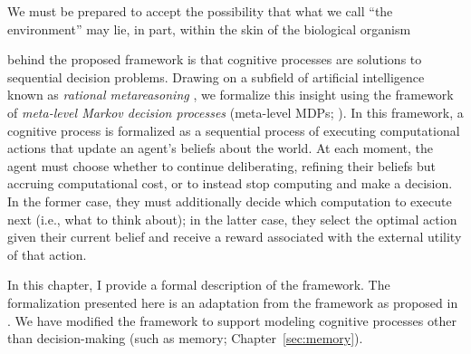 \begin{savequote}[75mm]
We must be prepared to accept the possibility that what we call ``the environment'' may lie, in part, within the skin of the biological organism
\end{savequote}


 behind the proposed framework is that cognitive processes are solutions to sequential decision problems. Drawing on a subfield of artificial intelligence known as \emph{rational metareasoning} \citep{matheson1968economic,russell1991principles}, we formalize this insight using the framework of \emph{meta-level Markov decision processes} (meta-level MDPs; \citealp{hay2012selecting}). In this framework, a cognitive process is formalized as a sequential process of executing computational actions that update an agent's beliefs about the world. At each moment, the agent must choose whether to continue deliberating, refining their beliefs but accruing computational cost, or to instead stop computing and make a decision. In the former case, they must additionally decide which computation to execute next (i.e., what to think about); in the latter case, they select the optimal action given their current belief and receive a reward associated with the external utility of that action.


In this chapter, I provide a formal description of the framework. The formalization presented here is an adaptation from the framework as proposed in \citet{hay2016principles}. We have modified the framework to support modeling cognitive processes other than decision-making (such as memory; Chapter~\ref{sec:memory}).


